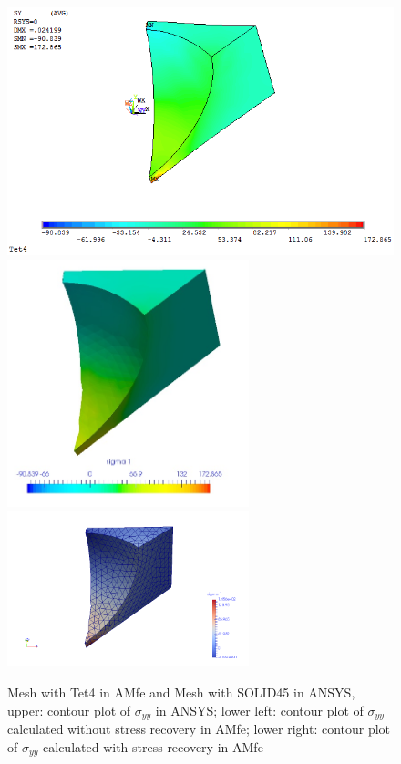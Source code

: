 \begin{figure}[htbp]
	\begin{center}
		\includegraphics[width=13cm,clip]{Tet4Syy.png} 
		\includegraphics[width=7cm,clip]{Tet4SyyPD.png} 			
		\includegraphics[width=7cm,clip]{Tet4SyyP.png} 		
		\caption{Mesh with Tet4 in AMfe and Mesh with SOLID45 in ANSYS, upper: contour plot of $\sigma_{yy}$ in ANSYS; lower left: contour plot of $\sigma_{yy}$ calculated without stress recovery in AMfe; lower right: contour plot of $\sigma_{yy}$ calculated with stress recovery in AMfe} \label{fig: Tet4_Syy}
	\end{center}
\end{figure}
\clearpage 

